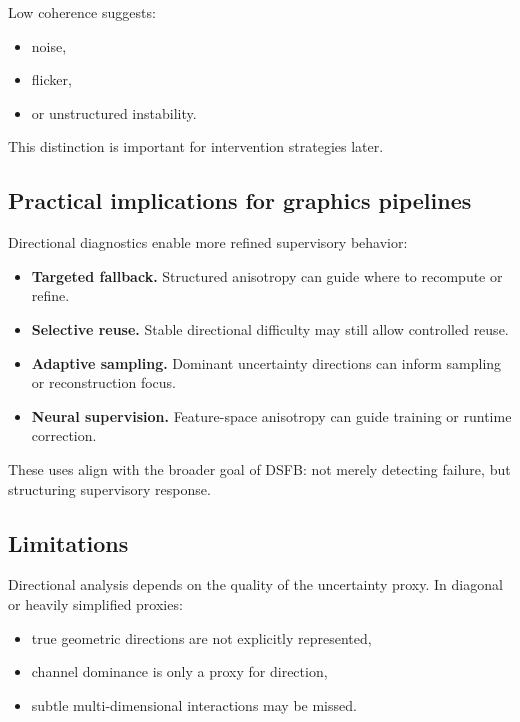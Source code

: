 \documentclass[11pt,letterpaper]{article}
\theoremstyle{gcresult}
\theoremstyle{definition}
\begin{document}
Low coherence suggests:
\begin{itemize}[leftmargin=1.5em]
    \item noise,
    \item flicker,
    \item or unstructured instability.
\end{itemize}

This distinction is important for intervention strategies later.


\subsection{Practical implications for graphics pipelines}

Directional diagnostics enable more refined supervisory behavior:

\begin{itemize}[leftmargin=1.5em]
    \item \textbf{Targeted fallback.} Structured anisotropy can guide where to recompute or refine.
    \item \textbf{Selective reuse.} Stable directional difficulty may still allow controlled reuse.
    \item \textbf{Adaptive sampling.} Dominant uncertainty directions can inform sampling or reconstruction focus.
    \item \textbf{Neural supervision.} Feature-space anisotropy can guide training or runtime correction.
\end{itemize}

These uses align with the broader goal of DSFB: not merely detecting failure, but structuring supervisory response.


\subsection{Limitations}

Directional analysis depends on the quality of the uncertainty proxy. In diagonal or heavily simplified proxies:
\begin{itemize}[leftmargin=1.5em]
    \item true geometric directions are not explicitly represented,
    \item channel dominance is only a proxy for direction,
    \item subtle multi-dimensional interactions may be missed.
\end{itemize}
\end{document}
